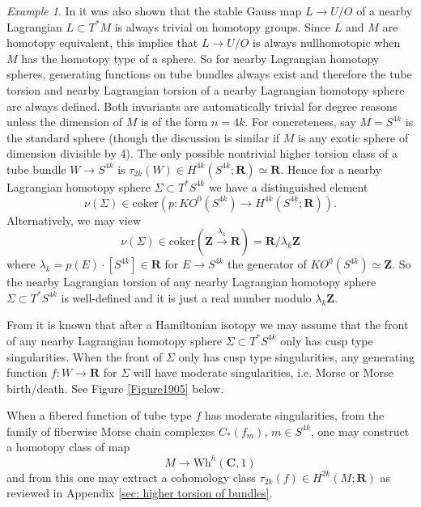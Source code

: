 \documentclass{amsart}
\def\bC{\mathbf{C}}
\def\bR{\mathbf{R}}
\def\bZ{\mathbf{Z}}
\theoremstyle{definition}
\theoremstyle{remark}
\newtheorem{example}[theorem]{Example}
\newtheorem{inductive lemma}[theorem]{Inductive Lemma}
\begin{document}
 
 \begin{example}   In \cite{ACGK} it was also shown that the stable Gauss map $L \to U/O$ of a nearby Lagrangian $L \subset T^*M$ is always trivial on homotopy groups. Since $L$ and $M$ are homotopy equivalent, this implies that $L \to U/O$ is always nullhomotopic when $M$ has the homotopy type of a sphere. So for nearby Lagrangian homotopy spheres, generating functions on tube bundles always exist and therefore the tube torsion and nearby Lagrangian torsion of a nearby Lagrangian homotopy sphere are always defined. Both invariants are automatically trivial for degree reasons unless the dimension of $M$ is of the form $n=4k$. For concreteness, say $M=S^{4k}$ is the standard sphere (though the discussion is similar if $M$ is any exotic sphere of dimension divisible by 4). The only possible nontrivial higher torsion class of a tube bundle $W \to S^{4k}$ is $\tau_{2k}(W) \in H^{4k}(S^{4k};\bR) \simeq \bR$. Hence for a nearby Lagrangian homotopy sphere $\Sigma \subset T^*S^{4k}$ we have a distinguished element $$\nu(\Sigma) \in \text{coker}\left(p:KO^0(S^{4k}) \to H^{4k}(S^{4k};\bR)  \right).$$
Alternatively, we may view
  $$\nu(\Sigma) \in \text{coker}\left( \bZ \xrightarrow{\lambda_k} \bR \right) = \bR / \lambda_k \bZ$$ where $\lambda_k=p(E) \cdot [S^{4k}]  \in \bR$ for $E \to S^{4k}$ the generator of $KO^0(S^{4k}) \simeq \bZ$. So the nearby Lagrangian torsion of any nearby Lagrangian homotopy sphere $\Sigma \subset T^*S^{4k}$ is well-defined and it is just a real number modulo $\lambda_k \bZ$. 
   \end{example}

From  \cite{AD22} it is known that after a Hamiltonian isotopy we may assume that the front of any nearby Lagrangian homotopy sphere $\Sigma \subset T^*S^{4k}$ only has cusp type singularities. When the front of $\Sigma$ only has cusp type singularities, any generating function $f:W \to \bR$ for $\Sigma$ will have moderate singularities, i.e. Morse or Morse birth/death. See Figure \ref{Figure1905} below.


When a fibered function of tube type $f$  has moderate singularities, from the family of fiberwise Morse chain complexes $C_*(f_m)$, $m \in S^{4k}$, one may construct a homotopy class of map 
$$ M \to \text{Wh}^h(\bC,1) $$
and from this one may extract a cohomology class $\tau_{2k}(f) \in H^{2k}(M;\bR)$ as reviewed in Appendix \ref{sec: higher torsion of bundles}.
 
\end{document}
